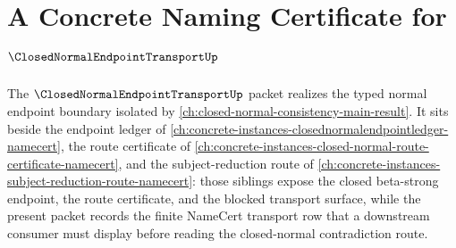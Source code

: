 \chapter{A Concrete Naming Certificate for $\ClosedNormalEndpointTransportUp$}
\label{ch:concrete-instances-closed-normal-endpoint-transport-namecert}

The $\ClosedNormalEndpointTransportUp$ packet realizes the typed normal endpoint boundary isolated by \autoref{ch:closed-normal-consistency-main-result}. It sits beside the endpoint ledger of \autoref{ch:concrete-instances-closednormalendpointledger-namecert}, the route certificate of \autoref{ch:concrete-instances-closed-normal-route-certificate-namecert}, and the subject-reduction route of \autoref{ch:concrete-instances-subject-reduction-route-namecert}: those siblings expose the closed beta-strong endpoint, the route certificate, and the blocked transport surface, while the present packet records the finite NameCert transport row that a downstream consumer must display before reading the closed-normal contradiction route.

